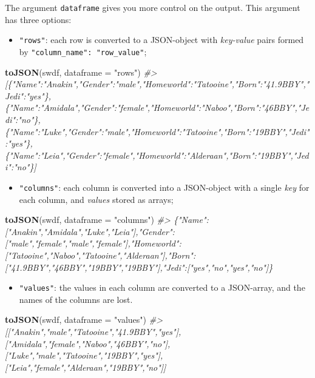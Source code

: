\documentclass[
]{book}
\newenvironment{Shaded}{\begin{snugshade}}{\end{snugshade}}
\newcommand{\AttributeTok}[1]{\textcolor[rgb]{0.13,0.29,0.53}{#1}}
\newcommand{\CommentTok}[1]{\textcolor[rgb]{0.56,0.35,0.01}{\textit{#1}}}
\newcommand{\FunctionTok}[1]{\textcolor[rgb]{0.13,0.29,0.53}{\textbf{#1}}}
\newcommand{\NormalTok}[1]{#1}
\newcommand{\StringTok}[1]{\textcolor[rgb]{0.31,0.60,0.02}{#1}}
\providecommand{\tightlist}{%
  \setlength{\itemsep}{0pt}\setlength{\parskip}{0pt}}
\begin{document}
The argument \texttt{dataframe} gives you more control on the output. This argument
has three options:

\begin{itemize}
\tightlist
\item
  \texttt{"rows"}: each row is converted to a JSON-object with \emph{key-value} pairs
  formed by \texttt{"column\_name":\ "row\_value"};
\end{itemize}

\begin{Shaded}
\begin{Highlighting}[]
\FunctionTok{toJSON}\NormalTok{(swdf, }\AttributeTok{dataframe =} \StringTok{"rows"}\NormalTok{)}
\CommentTok{\#\textgreater{} [\{"Name":"Anakin","Gender":"male","Homeworld":"Tatooine","Born":"41.9BBY","Jedi":"yes"\},\{"Name":"Amidala","Gender":"female","Homeworld":"Naboo","Born":"46BBY","Jedi":"no"\},\{"Name":"Luke","Gender":"male","Homeworld":"Tatooine","Born":"19BBY","Jedi":"yes"\},\{"Name":"Leia","Gender":"female","Homeworld":"Alderaan","Born":"19BBY","Jedi":"no"\}]}
\end{Highlighting}
\end{Shaded}

\begin{itemize}
\tightlist
\item
  \texttt{"columns"}: each column is converted into a JSON-object with a single \emph{key}
  for each column, and \emph{values} stored as arrays;
\end{itemize}

\begin{Shaded}
\begin{Highlighting}[]
\FunctionTok{toJSON}\NormalTok{(swdf, }\AttributeTok{dataframe =} \StringTok{"columns"}\NormalTok{)}
\CommentTok{\#\textgreater{} \{"Name":["Anakin","Amidala","Luke","Leia"],"Gender":["male","female","male","female"],"Homeworld":["Tatooine","Naboo","Tatooine","Alderaan"],"Born":["41.9BBY","46BBY","19BBY","19BBY"],"Jedi":["yes","no","yes","no"]\}}
\end{Highlighting}
\end{Shaded}

\begin{itemize}
\tightlist
\item
  \texttt{"values"}: the values in each column are converted to a JSON-array, and
  the names of the columns are lost.
\end{itemize}

\begin{Shaded}
\begin{Highlighting}[]
\FunctionTok{toJSON}\NormalTok{(swdf, }\AttributeTok{dataframe =} \StringTok{"values"}\NormalTok{)}
\CommentTok{\#\textgreater{} [["Anakin","male","Tatooine","41.9BBY","yes"],["Amidala","female","Naboo","46BBY","no"],["Luke","male","Tatooine","19BBY","yes"],["Leia","female","Alderaan","19BBY","no"]]}
\end{Highlighting}
\end{Shaded}
\end{document}
